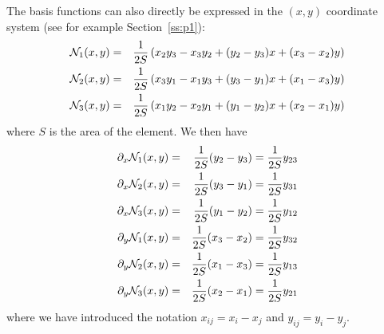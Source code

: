 The basis functions can also directly be expressed in the $(x,y)$ coordinate system
(see for example Section~\ref{ss:p1}):
\begin{eqnarray}
{\mathcal{N}}_1(x,y) &=& \frac{1}{2S} \left( x_2y_3-x_3y_2+(y_2-y_3)x+(x_3-x_2)y   \right) \nonumber\\
{\mathcal{N}}_2(x,y) &=& \frac{1}{2S} \left( x_3y_1-x_1y_3+(y_3-y_1)x+(x_1-x_3)y   \right) \nonumber\\
{\mathcal{N}}_3(x,y) &=& \frac{1}{2S} \left( x_1y_2-x_2y_1+(y_1-y_2)x+(x_2-x_1)y   \right) \nonumber
\end{eqnarray}
where $S$ is the area of the element.
We then have 
\begin{eqnarray}
\partial_x {\mathcal{N}}_1(x,y) &=& \frac{1}{2S}  (y_2-y_3) = \frac{1}{2S} y_{23} \nonumber\\
\partial_x {\mathcal{N}}_2(x,y) &=& \frac{1}{2S}  (y_3-y_1) = \frac{1}{2S} y_{31} \nonumber\\
\partial_x {\mathcal{N}}_3(x,y) &=& \frac{1}{2S}  (y_1-y_2) = \frac{1}{2S} y_{12} \nonumber\\
\partial_y {\mathcal{N}}_1(x,y) &=& \frac{1}{2S}  (x_3-x_2) = \frac{1}{2S} y_{32} \nonumber\\
\partial_y {\mathcal{N}}_2(x,y) &=& \frac{1}{2S}  (x_1-x_3) = \frac{1}{2S} y_{13} \nonumber\\
\partial_y {\mathcal{N}}_3(x,y) &=& \frac{1}{2S}  (x_2-x_1) = \frac{1}{2S} y_{21} \nonumber
\end{eqnarray}
where we have introduced the notation $x_{ij}=x_i-x_j$ and $y_{ij}=y_i-y_j$.

